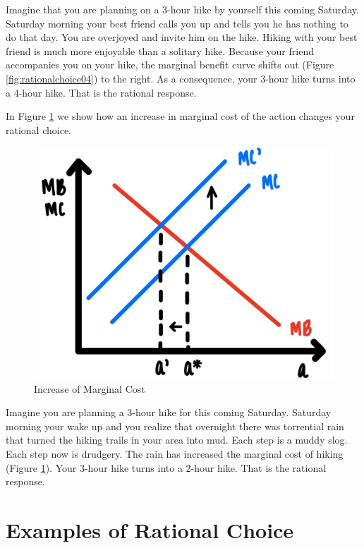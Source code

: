 \documentclass[
]{book}
\begin{document}
Imagine that you are planning on a 3-hour hike by yourself this coming Saturday. Saturday morning your best friend calls you up and tells you he has nothing to do that day. You are overjoyed and invite him on the hike. Hiking with your best friend is much more enjoyable than a solitary hike. Because your friend accompanies you on your hike, the marginal benefit curve shifts out (Figure \ref{fig:rationalchoice04}) to the right. As a consequence, your 3-hour hike turns into a 4-hour hike. That is the rational response.

In Figure \ref{fig:rationalchoice05} we show how an increase in marginal cost of the action changes your rational choice.

\begin{figure}

{\centering \includegraphics[width=0.75\linewidth]{img/rationalchoice/fig5} 

}

\caption{Increase of Marginal Cost}\label{fig:rationalchoice05}
\end{figure}

Imagine you are planning a 3-hour hike for this coming Saturday. Saturday morning your wake up and you realize that overnight there was torrential rain that turned the hiking trails in your area into mud. Each step is a muddy slog. Each step now is drudgery. The rain has increased the marginal cost of hiking (Figure \ref{fig:rationalchoice05}). Your 3-hour hike turns into a 2-hour hike. That is the rational response.

\hypertarget{examples-of-rational-choice}{%
\section{Examples of Rational Choice}\label{examples-of-rational-choice}}
\end{document}
